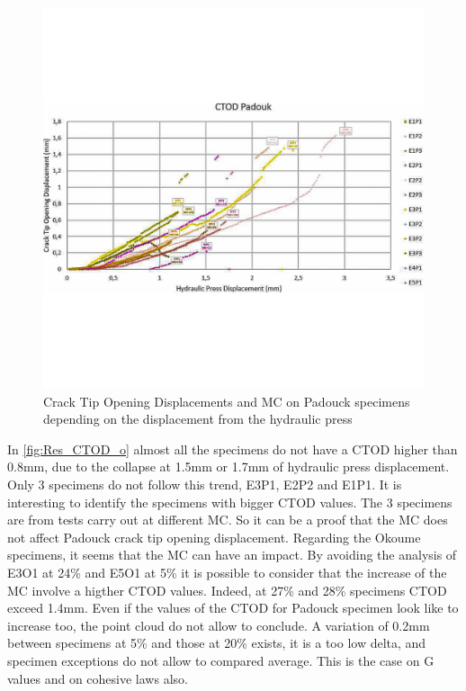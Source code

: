 \newpage
\begin{figure}
	\centering
	\includegraphics[width=\textwidth]{Figures/Res_CTOD_p}
	\decoRule
	\caption[CTOD and MC on Padouck specimens]{Crack Tip Opening Displacements and MC on Padouck specimens depending on the displacement from the hydraulic press}
	\label{fig:Res_CTOD_p}
\end{figure}
In \ref{fig:Res_CTOD_o} almost all the specimens do not have a CTOD higher than 0.8\si{\milli\meter}, due to the collapse at 1.5\si{\milli\meter} or 1.7\si{\milli\meter} of hydraulic press displacement. Only 3 specimens do not follow this trend, E3P1, E2P2 and E1P1. It is interesting to identify the specimens with bigger CTOD values. The 3 specimens are from tests carry out at different MC. So it can be a proof that the MC does not affect Padouck crack tip opening displacement. Regarding the Okoume specimens, it seems that the MC can have an impact. By avoiding the analysis of E3O1 at 24\% and E5O1 at 5\% it is possible to consider that the increase of the MC involve a higther CTOD values. Indeed, at 27\% and 28\% specimens CTOD exceed 1.4\si{\milli\meter}. Even if the values of the CTOD for Padouck specimen look like to increase too, the point cloud do not allow to conclude. A variation of 0.2\si{\milli\meter} between specimens at 5\% and those at 20\% exists, it is a too low delta, and specimen exceptions do not allow to compared average. This is the case on G values and on cohesive laws also.

